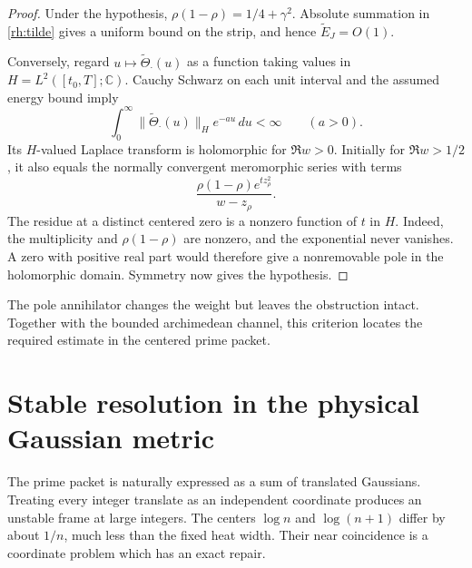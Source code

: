 \begin{proof}
Under the hypothesis, \(\rho(1-\rho)=1/4+\gamma^2\). Absolute summation in \eqref{rh:tilde} gives a uniform bound on the strip, and hence \(\widetilde E_J=O(1)\).

Conversely, regard \(u\mapsto\widetilde\Theta_\cdot(u)\) as a function taking values in \(H=L^2([t_0,T];\mathbb C)\). Cauchy Schwarz on each unit interval and the assumed energy bound imply
\[
\int_0^\infty\|\widetilde\Theta_\cdot(u)\|_H e^{-au}\,du<\infty
\qquad(a>0).
\]
Its \(H\)-valued Laplace transform is holomorphic for \(\Re w>0\). Initially for \(\Re w>1/2\), it also equals the normally convergent meromorphic series with terms
\[
\frac{\rho(1-\rho)e^{t z_\rho^2}}{w-z_\rho}.
\]
The residue at a distinct centered zero is a nonzero function of \(t\) in \(H\). Indeed, the multiplicity and \(\rho(1-\rho)\) are nonzero, and the exponential never vanishes. A zero with positive real part would therefore give a nonremovable pole in the holomorphic domain. Symmetry now gives the hypothesis.
\end{proof}

The pole annihilator changes the weight but leaves the obstruction intact. Together with the bounded archimedean channel, this criterion locates the required estimate in the centered prime packet.

\section{Stable resolution in the physical Gaussian metric}

The prime packet is naturally expressed as a sum of translated Gaussians. Treating every integer translate as an independent coordinate produces an unstable frame at large integers. The centers \(\log n\) and \(\log(n+1)\) differ by about \(1/n\), much less than the fixed heat width. Their near coincidence is a coordinate problem which has an exact repair.

